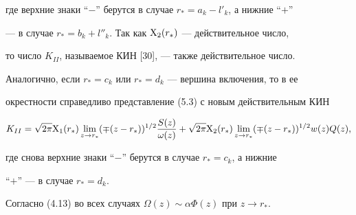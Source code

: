 где верхние знаки ``$-$'' берутся в случае $r_*=a_k-l'_k$, а нижние ``$+$'' 


--- в случае $r_*=b_k+l''_k$. Так как $\mathrm X_2(r_*)$ --- действительное число, 


то число $K_{II}$, называемое КИН [30], --- также действительное число. 


Аналогично, если $r_*=c_k$ или $r_*=d_k$ --- вершина включения, то в ее 


окрестности справедливо представление (5.3) с новым действительным КИН 


$$ 


K_{II}=\sqrt{2\pi}\X_1(r_*)\lim_{z\to r_*} 


(\mp(z-r_*))^{1/2}\frac{S(z)}{\omega(z)}+\sqrt{2\pi}\X_2(r_*) 


\lim_{z\to r_*}(\mp(z-r_*))^{1/2}w(z)Q(z), 


$$ 


где снова верхние знаки ``$-$'' берутся в случае $r_*=c_k$, а нижние 


``$+$'' --- в случае $r_*=d_k$. 


 


Согласно (4.13) во всех случаях $\Omega(z)\sim\alpha\Phi(z)$ при $z\to r_*$. 


 


 


